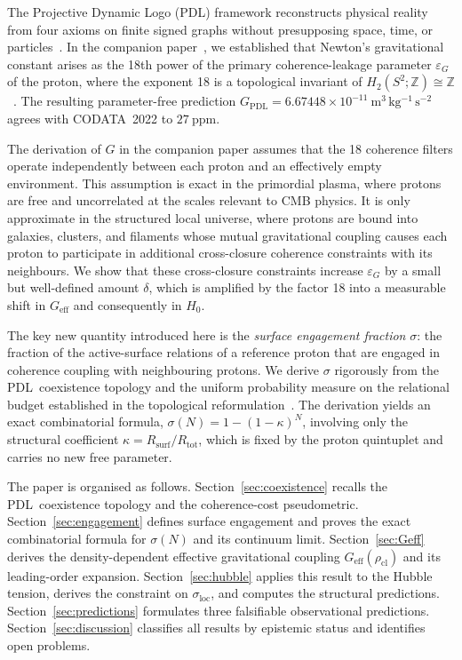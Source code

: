 \documentclass[11pt,a4paper]{article}
\theoremstyle{definition}
\newcommand{\PDL}{\textnormal{PDL}}
\newcommand{\Rsurf}{R_{\mathrm{surf}}}
\newcommand{\Rtot}{R_{\mathrm{tot}}}
\newcommand{\epsg}{\varepsilon_G}
\newcommand{\GPDL}{G_{\mathrm{PDL}}}
\newcommand{\Geff}{G_{\mathrm{eff}}}
\newcommand{\kap}{\kappa}
\newcommand{\sig}{\sigma}
\newcommand{\rhocl}{\rho_{\mathrm{cl}}}
\newcommand{\Hzero}{H_0}
\begin{document}
The Projective Dynamic Logo (\PDL) framework reconstructs physical reality from four axioms on finite signed graphs without presupposing space, time, or particles~\cite{PDL_Main_2026,PDL_Intro_2026}. In the companion paper~\cite{PDL_Bridge_2026}, we established that Newton's gravitational constant arises as the 18th power of the primary coherence-leakage parameter $\epsg$ of the proton, where the exponent 18 is a topological invariant of $H_2(S^2;\mathbb{Z}) \cong \mathbb{Z}$~\cite{Topology_18_PDL_2026}. The resulting parameter-free prediction $\GPDL = 6.67448 \times 10^{-11}\ \mathrm{m^3\,kg^{-1}\,s^{-2}}$ agrees with CODATA~2022 to $27\ \mathrm{ppm}$.

The derivation of $G$ in the companion paper assumes that the 18 coherence filters operate independently between each proton and an effectively empty environment. This assumption is exact in the primordial plasma, where protons are free and uncorrelated at the scales relevant to CMB physics. It is only approximate in the structured local universe, where protons are bound into galaxies, clusters, and filaments whose mutual gravitational coupling causes each proton to participate in additional cross-closure coherence constraints with its neighbours. We show that these cross-closure constraints increase $\epsg$ by a small but well-defined amount $\delta$, which is amplified by the factor 18 into a measurable shift in $\Geff$ and consequently in $\Hzero$.

The key new quantity introduced here is the \emph{surface engagement fraction} $\sig$: the fraction of the active-surface relations of a reference proton that are engaged in coherence coupling with neighbouring protons. We derive $\sig$ rigorously from the \PDL\ coexistence topology and the uniform probability measure on the relational budget established in the topological reformulation~\cite{Topological_Reformulation_PDL_2026}. The derivation yields an exact combinatorial formula, $\sig(N) = 1-(1-\kap)^N$, involving only the structural coefficient $\kap = \Rsurf/\Rtot$, which is fixed by the proton quintuplet and carries no new free parameter.

The paper is organised as follows. Section~\ref{sec:coexistence} recalls the \PDL\ coexistence topology and the coherence-cost pseudometric. Section~\ref{sec:engagement} defines surface engagement and proves the exact combinatorial formula for $\sig(N)$ and its continuum limit. Section~\ref{sec:Geff} derives the density-dependent effective gravitational coupling $\Geff(\rhocl)$ and its leading-order expansion. Section~\ref{sec:hubble} applies this result to the Hubble tension, derives the constraint on $\sig_{\mathrm{loc}}$, and computes the structural predictions. Section~\ref{sec:predictions} formulates three falsifiable observational predictions. Section~\ref{sec:discussion} classifies all results by epistemic status and identifies open problems.
\end{document}

